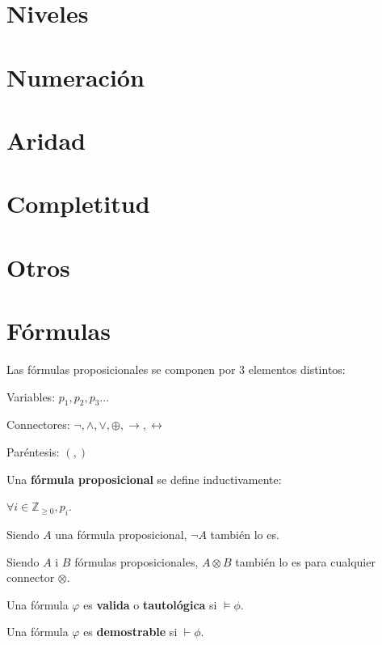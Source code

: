 \documentclass[12pt]{report}
\begin{document}
	\section{Niveles}
	\section{Numeración}
	\section{Aridad}
	\section{Completitud}
	\section{Otros}
	
	
	
	
	\section{Fórmulas}
	
	Las fórmulas proposicionales se componen por 3 elementos distintos:
	\begin{e1}
		\item Variables: $p_1, p_2, p_3...$
		\item Connectores: $¬, \wedge, \vee, \oplus, \to, \leftrightarrow$
		\item Paréntesis: $(, )$
	\end{e1}
	
	\begin{defin}
		Una \textbf{fórmula proposicional} se define inductivamente:
		\begin{ne1}
			\item $\forall i\in\mathbb{Z}_{\ge 0}, p_i$.
			\item Siendo $A$ una fórmula proposicional, $¬A$ también lo es.
			\item Siendo $A$ i $B$ fórmulas proposicionales, $A\otimes B$ también lo es para cualquier connector $\otimes$.
		\end{ne1}
	\end{defin}
	
	\begin{defin}
		Una fórmula $\varphi$ es \textbf{valida} o \textbf{tautológica} si $\vDash \phi$.
	\end{defin}
	\begin{defin}
		Una fórmula $\varphi$ es \textbf{demostrable} si $\vdash \phi$.
	\end{defin}
	
\end{document}
